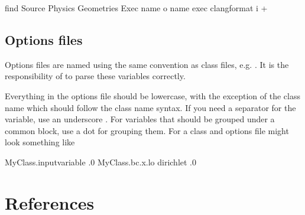 \documentclass[letterpaper,10pt,english]{sphinxmanual}
\begin{document}
\begin{sphinxVerbatim}[commandchars=\\\{\},formatcom=\scriptsize]
find Source Physics Geometries Exec  \PYGZhy{}name  \PYGZhy{}o \PYGZhy{}name   \PYGZhy{}exec clang\PYGZhy{}format \PYGZhy{}i  +
\end{sphinxVerbatim}


\subsection{Options files}
\label{\detokenize{Contrib/CodeStandard:options-files}}
Options files are named using the same convention as class files, e.g. .
It is the responsibility of  to parse these variables correctly.

Everything in the options file should be lower\sphinxhyphen{}case, with the exception of the class name which should follow the class name syntax.
If you need a separator for the variable, use an underscore \sphinxcode{\sphinxupquote{\_}}.
For variables that should be grouped under a common block, use a dot  for grouping them.
For a class  and options file might look something like

\begin{sphinxVerbatim}[commandchars=\\\{\},formatcom=\scriptsize]
MyClass.input\PYGZus{}variable  .0
MyClass.bc.x.lo         dirichlet .0
\end{sphinxVerbatim}


\section{References}
\label{\detokenize{ZZReferences:references}}\label{\detokenize{ZZReferences::doc}}
\end{document}
